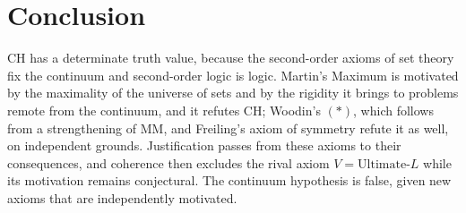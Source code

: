 \documentclass{situationist-preprint}
\begin{document}
\section{Conclusion}

CH has a determinate truth value, because the second-order axioms of set theory fix the continuum and second-order logic is logic. Martin's Maximum is motivated by the maximality of the universe of sets and by the rigidity it brings to problems remote from the continuum, and it refutes CH; Woodin's $(*)$, which follows from a strengthening of MM, and Freiling's axiom of symmetry refute it as well, on independent grounds. Justification passes from these axioms to their consequences, and coherence then excludes the rival axiom $V = \text{Ultimate-}L$ while its motivation remains conjectural. The continuum hypothesis is false, given new axioms that are independently motivated.
\end{document}
